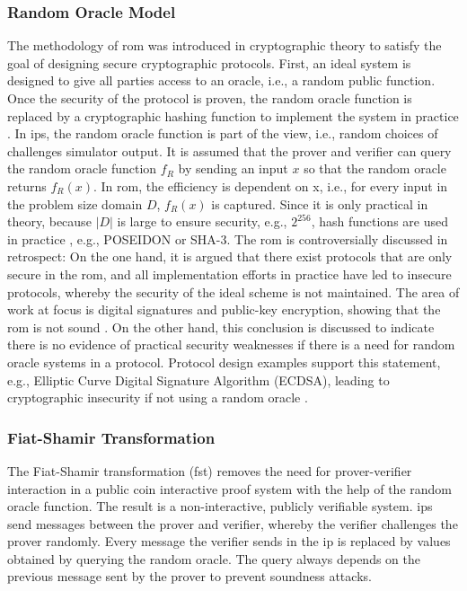 \subsubsection{Random Oracle Model}
The methodology of \acrshort{rom} was introduced in cryptographic theory to satisfy the goal of designing secure cryptographic protocols. First, an ideal system is designed to give all parties access to an oracle, i.e., a random public function. Once the security of the protocol is proven, the random oracle function is replaced by a cryptographic hashing function to implement the system in practice \citep{ROMBellare}. In \acrshort{ip}s, the random oracle function is part of the view, i.e., random choices of challenges simulator output. It is assumed that the prover and verifier can query the random oracle function \(f_R\) by sending an input \(x\) so that the random oracle returns \(f_R(x)\). In \acrshort{rom}, the efficiency is dependent on x, i.e., for every input in the problem size domain \(D\), \(f_R(x)\) is captured. Since it is only practical in theory, because \(|D|\) is large to ensure security, e.g., \(2^{256}\), hash functions are used in practice \citep{ROMBellare, Thaler}, e.g., POSEIDON or SHA-3. The \acrshort{rom} is controversially discussed in retrospect: On the one hand, it is argued that there exist protocols that are only secure in the \acrshort{rom}, and all implementation efforts in practice have led to insecure protocols, whereby the security of the ideal scheme is not maintained. The area of work at focus is digital signatures and public-key encryption, showing that the \acrshort{rom} is not sound \citep{ROMCanetti}. On the other hand, this conclusion is discussed to indicate there is no evidence of practical security weaknesses if there is a need for random oracle systems in a protocol. Protocol design examples support this statement, e.g., Elliptic Curve Digital Signature Algorithm (ECDSA), leading to cryptographic insecurity if not using a random oracle \citep{ROMretroKoblitz}. 
\subsubsection{Fiat-Shamir Transformation}
The Fiat-Shamir transformation (\acrshort{fst}) \citep{ROMFiat1986HowTP} removes the need for prover-verifier interaction in a public coin interactive proof system with the help of the random oracle function. The result is a non-interactive, publicly verifiable system. \acrshort{ip}s send messages between the prover and verifier, whereby the verifier challenges the prover randomly. Every message the verifier sends in the \acrshort{ip} is replaced by values obtained by querying the random oracle. The query always depends on the previous message sent by the prover to prevent soundness attacks.

